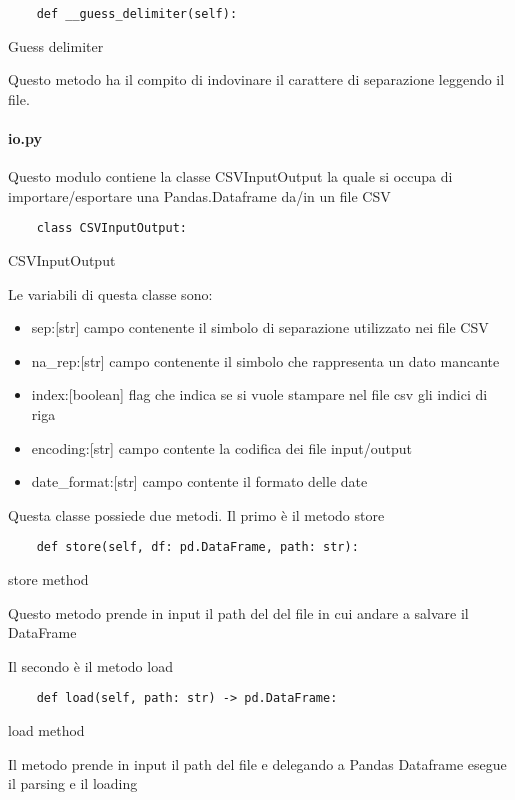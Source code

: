 \begin{listing}[H]
\begin{verbatim}
    def __guess_delimiter(self):
\end{verbatim}
\caption{Guess delimiter}
\label{Code:2}
\end{listing}

Questo metodo ha il compito di indovinare il carattere di separazione leggendo il file.

\paragraph{io.py}
Questo modulo contiene la classe CSVInputOutput la quale si occupa di importare/esportare una Pandas.Dataframe da/in un file CSV
\begin{listing}[H]
\begin{verbatim}
    class CSVInputOutput:
\end{verbatim}
\caption{CSVInputOutput}
\label{Code:3}
\end{listing}
Le variabili di questa classe sono:
\begin{itemize}[noitemsep]
    \item sep:[str] campo contenente il simbolo di separazione utilizzato nei file CSV
    \item na{\_}rep:[str] campo contenente il simbolo che rappresenta un dato mancante 
    \item index:[boolean] flag che indica se si vuole stampare nel file csv gli indici di riga
    \item encoding:[str] campo contente la codifica dei file input/output
    \item date{\_}format:[str] campo contente il formato delle date
\end{itemize}
Questa classe possiede due metodi.
Il primo è il metodo store
\begin{listing}[H]
\begin{verbatim}
    def store(self, df: pd.DataFrame, path: str):
\end{verbatim}
\caption{store method}
\label{Code:4}
\end{listing}
Questo metodo prende in input il path del del file in cui andare a salvare il DataFrame

Il secondo è il metodo load
\begin{listing}[H]
\begin{verbatim}
    def load(self, path: str) -> pd.DataFrame:
\end{verbatim}
\caption{load method}
\label{Code:5}
\end{listing}
Il metodo prende in input il path del file e delegando a Pandas Dataframe esegue il parsing e il loading


